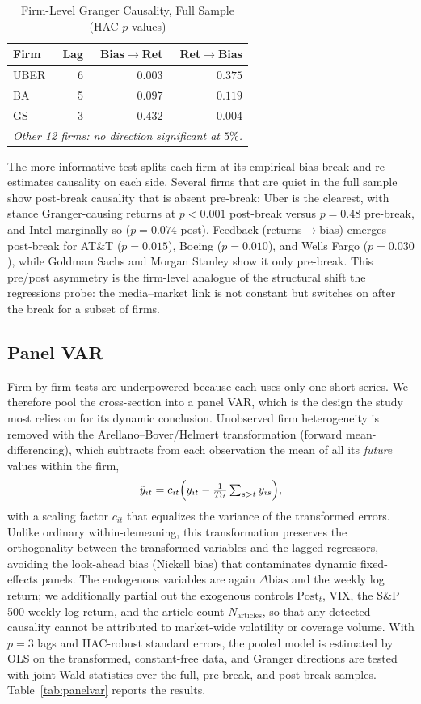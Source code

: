 \documentclass[conference]{IEEEtran}
\begin{document}
\begin{table}[!t]
\caption{Firm-Level Granger Causality, Full Sample (HAC $p$-values)}
\label{tab:granger}
\centering
\small
\begin{tabular}{lrrr}
\toprule
Firm & Lag & Bias$\to$Ret & Ret$\to$Bias \\
\midrule
UBER & 6 & $0.003$ & $0.375$ \\
BA   & 5 & $0.097$ & $0.119$ \\
GS   & 3 & $0.432$ & $0.004$ \\
\multicolumn{4}{l}{\textit{Other 12 firms: no direction significant at $5\%$.}}\\
\bottomrule
\end{tabular}
\end{table}

The more informative test splits each firm at its empirical bias break and
re-estimates causality on each side. Several firms that are quiet in the full
sample show post-break causality that is absent pre-break: Uber is the clearest,
with stance Granger-causing returns at $p<0.001$ post-break versus $p=0.48$
pre-break, and Intel marginally so ($p=0.074$ post). Feedback
(returns$\to$bias) emerges post-break for AT\&T ($p=0.015$), Boeing ($p=0.010$),
and Wells Fargo ($p=0.030$), while Goldman Sachs and Morgan Stanley show it only
pre-break. This pre/post asymmetry is the firm-level analogue of the structural
shift the regressions probe: the media--market link is not constant but switches
on after the break for a subset of firms.

\subsection{Panel VAR}
Firm-by-firm tests are underpowered because each uses only one short series. We
therefore pool the cross-section into a panel VAR, which is the design the study
most relies on for its dynamic conclusion. Unobserved firm heterogeneity is
removed with the Arellano--Bover/Helmert transformation (forward
mean-differencing), which subtracts from each observation the mean of all its
\emph{future} values within the firm,
\begin{equation}
\tilde{y}_{it} = c_{it}\Bigl(y_{it} - \tfrac{1}{T_{it}}\textstyle\sum_{s>t} y_{is}\Bigr),
\end{equation}
with a scaling factor $c_{it}$ that equalizes the variance of the transformed
errors. Unlike ordinary within-demeaning, this transformation preserves the
orthogonality between the transformed variables and the lagged regressors,
avoiding the look-ahead bias (Nickell bias) that contaminates dynamic
fixed-effects panels. The endogenous variables are again $\Delta\text{bias}$ and
the weekly log return; we additionally partial out the exogenous controls
$\text{Post}_t$, VIX, the S\&P 500 weekly log return, and the article count
$N_{\text{articles}}$, so that any detected causality cannot be attributed to
market-wide volatility or coverage volume. With $p=3$ lags and HAC-robust
standard errors, the pooled model is estimated by OLS on the transformed,
constant-free data, and Granger directions are tested with joint Wald statistics
over the full, pre-break, and post-break samples. Table~\ref{tab:panelvar}
reports the results.
\end{document}
